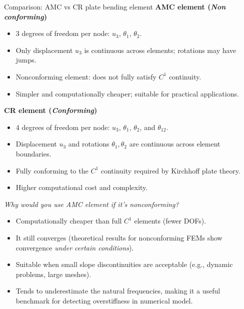 \documentclass[aspectratio=169]{beamer}
\begin{document}
\begin{frame}{Comparison: AMC vs CR plate bending element}
  \textbf{AMC element (\emph{Non conforming})}
  \begin{itemize}
    \item 3 degrees of freedom per node: \( u_3\), \( \theta_1 \), \( \theta_2 \).
    \item Only displacement \( u_3 \) is continuous across elements; rotations may have jumps.
    \item Nonconforming element: does not fully satisfy \( C^1 \) continuity.
    \item Simpler and computationally cheaper; suitable for practical applications.
  \end{itemize}
  \vspace{0.5cm}

  \textbf{CR element (\emph{Conforming})}
  \begin{itemize}
    \item 4 degrees of freedom per node: \( u_3 \), \( \theta_1 \), \( \theta_2 \), and \(  \theta_{12} \).
    \item Displacement \( u_3 \) and rotations \( \theta_1, \theta_2 \) are continuous across element boundaries.
    \item Fully conforming to the \( C^1 \) continuity required by Kirchhoff plate theory.
    \item Higher computational cost and complexity.
  \end{itemize}
\end{frame}

\begin{frame}{\emph{Why would you use AMC element if it's nonconforming?}}
  \begin{itemize}
    \item Computationally cheaper than full $C^1$ elements (fewer DOFs).
    \item It still converges (theoretical results for nonconforming FEMs show convergence \emph{under certain conditions}).
    \item Suitable when small slope discontinuities are acceptable (e.g., dynamic problems, large meshes).
    \item Tends to underestimate the natural frequencies, making it a useful benchmark for detecting overstiffness in numerical model.
  \end{itemize}
\end{frame}
\end{document}
